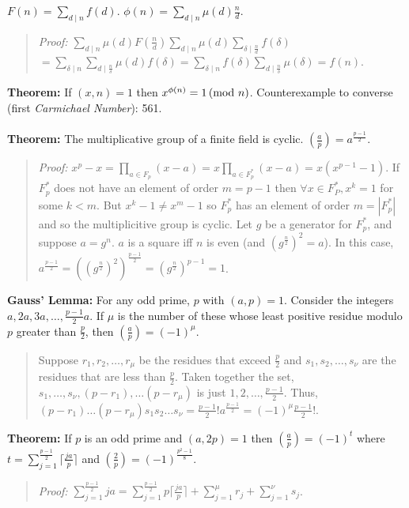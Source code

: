 $F(n)=  \sum_{d \mid n} f(d)$.
$\phi(n)=  \sum_{d \mid n} \mu(d) {\frac {n} {d}}$.
\begin{quote}
\emph{Proof:}
$\sum_{d \mid n} \mu(d) F({\frac {n} {d}})
\sum_{d \mid n} \mu(d) \sum_{\delta  \mid  {\frac n d}} f(\delta)$
$=\sum_{\delta  \mid n} \sum_{d  \mid  {\frac n \delta}} \mu(d) f(\delta)=
\sum_{\delta  \mid n} f(\delta) \sum_{d  \mid  {\frac n \delta}} \mu(\delta) = f(n)$.
\end{quote}
{\bf Theorem:} If $(x,n)=1$ then $x^{\phi(n)}= 1 \thinspace \textnormal{(mod } n \textnormal{)}$.  Counterexample to converse
(first \emph{Carmichael Number}): 561.
\\
\\
{\bf Theorem:}
The multiplicative group of a finite field is cyclic.
$({\frac {a} {p}}) = a^{\frac {p-1} {2}}$.
\begin{quote}
\emph{Proof:}
$x^p-x = \prod_{a \in F_p} (x-a) = x \prod_{a \in F_p^*} (x-a) = x (x^{p-1} -1) $.
If $F_p^*$ does not have an element of order $m=p-1$ then $\forall x \in F_P^*, x^k = 1$
for some $k < m$. But $x^k-1 \ne x^m -1$ so $F_p^*$ has an element of order
$m = |F_p^*|$ and so the multiplicitive group is cyclic.  Let $g$ be a generator for
$F_p^*$, and suppose $a = g^n$.  $a$ is a square iff $n$ is even (and $(g^{\frac n 2})^2 = a$).
In this case, 
$a^{\frac {p-1} {2}}= ((g^{\frac n 2})^2)^{\frac {p-1} 2} = (g^{\frac n 2})^{p-1} = 1$.
\end{quote}
{\bf Gauss' Lemma:} 
For any odd prime, $p$ with $(a,p)=1$.  Consider the integers
$a, 2a, 3a, \ldots, {\frac {p-1} 2}a$.  If $\mu$ is the number of
these whose least positive residue modulo $p$ greater than ${\frac p 2}$,
then $({\frac a p})= (-1)^{\mu}$.
\begin{quote}
Suppose $r_1 , r_2 , \ldots , r_{\mu}$ be the residues that exceed ${\frac p 2}$
and $s_1, s_2 , \ldots , s_{\nu}$ are the residues that are less
than ${\frac p 2}$.  Taken together the set, $s_1, \ldots, s_{\nu},
(p-r_1), \ldots (p-r_{\mu})$ is just
$1, 2, \ldots , {\frac {p-1} 2}$.  Thus,
$(p-r_1 ) \ldots (p-r_{\mu})s_1 s_2 \ldots s_{\nu} =
{\frac {p-1} 2}! a^{\frac {p-1} 2} = (-1)^{\mu} {\frac {p-1} 2}!$.
\end{quote}
{\bf Theorem:} 
If $p$ is an odd prime and $(a,2p)=1$ then $({\frac a p}) = (-1)^t$ where
$t= \sum_{j=1}^{\frac {p-1} 2} \lceil {\frac {ja} p} \rceil$ and $({\frac 2 p})=
(-1)^{\frac {p^2 -1} 8}$.
\begin{quote}
\emph{Proof:}
$\sum_{j=1}^{\frac {p-1} 2} ja =
\sum_{j=1}^{\frac {p-1} 2} p \lceil {\frac {ja} p} \rceil + \sum_{j=1}^{\mu} r_j +
\sum_{j=1}^{\nu} s_j$.
\end{quote}
